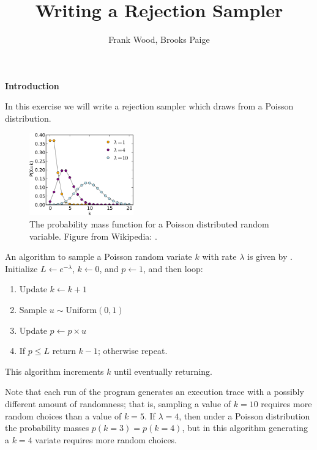 \documentclass[11pt,reqno]{amsart}
\title{Writing a Rejection Sampler}
\author{Frank Wood, Brooks Paige}
\newcommand{\+}[1]{\ensuremath{{\mathbf{#1}}}}
\begin{document}
\maketitle


{\bf Introduction}

In this exercise we will write a rejection sampler which draws from a Poisson distribution.
\begin{figure}[tb]
\centering
\includegraphics[width=0.4\textwidth]{poisson-pmf}
\caption{The probability mass function for a Poisson distributed random variable. 
Figure from Wikipedia: .
}
\end{figure}
An algorithm to sample a Poisson random variate $k$ with rate $\lambda$ is given by \cite{knuth1969}.
Initialize $L \leftarrow e^{-\lambda}$, $k \leftarrow 0$, and $p \leftarrow 1$, and then loop:
\begin{enumerate}
\item Update $k \leftarrow k+1$
\item Sample $u \sim \mathrm{Uniform}(0, 1)$
\item Update $p \leftarrow p \times u$
\item If $p \le L$ return $k -1$; otherwise repeat.
\end{enumerate}
This algorithm increments $k$ until eventually returning.

Note that each run of the program generates an execution trace with a possibly different amount of randomness;
that is, sampling a value of $k=10$ requires more random choices than a value of $k = 5$.
If $\lambda = 4$, then under a Poisson distribution the probability masses $p(k=3) = p(k=4)$, but in this algorithm generating a $k = 4$ variate requires more random choices.
\end{document}
